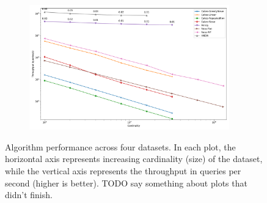 \begin{figure}
\begin{subfigure}[b]{0.4\textwidth}
\label{fig:results:sift-scaling}
\end{subfigure}%
\begin{subfigure}[b]{0.4\textwidth}
\includegraphics[width=0.95\textwidth]{plots/random-1000000-128-knn-10.png}\\
\label{fig:results:random-scaling}
\end{subfigure}%

\caption{Algorithm performance across four datasets. In each plot, the horizontal axis represents increasing cardinality (size) of the dataset, while the vertical axis represents the throughput in queries per second (higher is better). TODO say something about plots that didn't finish.}
\end{figure}

% 




